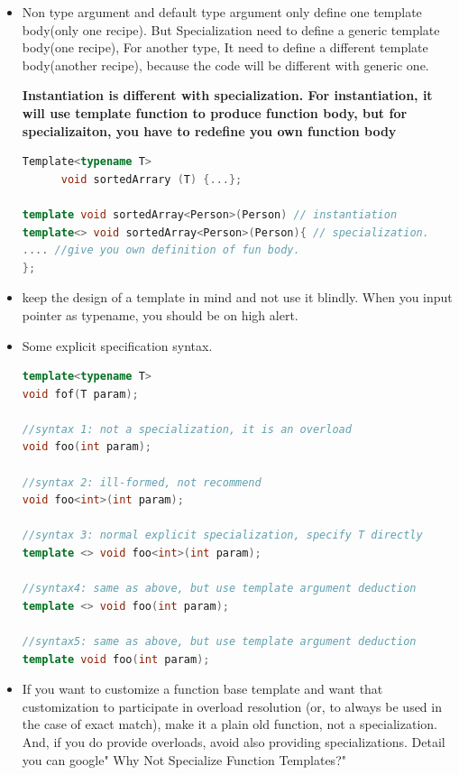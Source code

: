 \documentclass[a4paper,12pt,twoside]{book}
\begin{document}
\begin{itemize}
\item Non type argument and default type argument only define one template body(only one recipe). But Specialization need to define a generic template body(one recipe), For another type, It need to define a different template body(another recipe), because the code will be different with generic one.

\textbf{Instantiation is different with specialization.  For instantiation, it will use template function to produce function body, but for specializaiton, you have to redefine you own function body }

\begin{lstlisting}[frame=single, language=c++]
Template<typename T>
      void sortedArrary (T) {...};

template void sortedArray<Person>(Person) // instantiation
template<> void sortedArray<Person>(Person){ // specialization.
.... //give you own definition of fun body.
};
\end{lstlisting}


\item keep the design of a template in mind and not use it blindly. When you input pointer as typename, you should be on high alert.

\item Some explicit specification syntax.

\begin{lstlisting}[frame=single, language=c++]
template<typename T>
void fof(T param);

//syntax 1: not a specialization, it is an overload
void foo(int param);

//syntax 2: ill-formed, not recommend
void foo<int>(int param);

//syntax 3: normal explicit specialization, specify T directly
template <> void foo<int>(int param);

//syntax4: same as above, but use template argument deduction
template <> void foo(int param);

//syntax5: same as above, but use template argument deduction
template void foo(int param);
\end{lstlisting}

\item  If you want to customize a function base template and want that customization to participate in overload resolution (or, to always be used in the case of exact match), make it a plain old function, not a specialization. And, if you do provide overloads, avoid also providing specializations. Detail you can google" Why Not Specialize Function Templates?"


\end{itemize}
\end{document}
